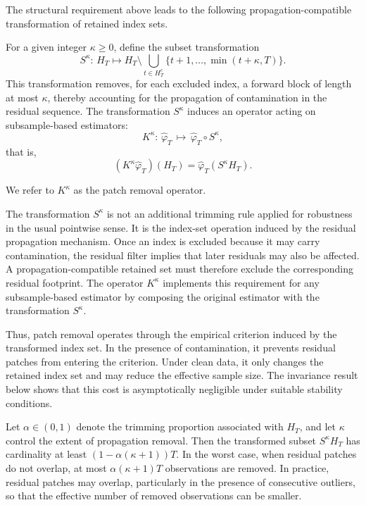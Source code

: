 \documentclass[12pt]{article}
\numberwithin{equation}{section}
\begin{document}
The structural requirement above leads to the following propagation-compatible transformation of retained index sets.
\begin{definition}
For a given integer $\kappa \geq 0$, define the subset transformation
\begin{equation}\label{eqn:patch-removal}
S^\kappa:\, H_T \mapsto 
H_T \setminus
\bigcup_{t \in H_T^c}
\{t+1, \dots, \min(t+\kappa, T)\}.
\end{equation}
This transformation removes, for each excluded index, a forward block of length at most $\kappa$, thereby accounting for the propagation of contamination in the residual sequence.
The transformation $S^\kappa$ induces an operator acting on subsample-based estimators:
\begin{equation}\label{eqn:PROperator1}
K^\kappa:\, \hat{\varphi}_T\, \mapsto\, \hat{\varphi}_T \circ S^\kappa,
\end{equation}
that is,
\begin{equation}\label{eqn:PROperator2}
(K^\kappa \hat{\varphi}_T)(H_T)
=
\hat{\varphi}_T(S^\kappa H_T).
\end{equation}

We refer to $K^\kappa$ as the patch removal operator.
\end{definition}
The transformation $S^\kappa$ is not an additional trimming rule applied for robustness in the usual pointwise sense. 
It is the index-set operation induced by the residual propagation mechanism. 
Once an index is excluded because it may carry contamination, the residual filter implies that later residuals may also be affected. 
A propagation-compatible retained set must therefore exclude the corresponding residual footprint. 
The operator $K^\kappa$ implements this requirement for any subsample-based estimator by composing the original estimator with the transformation $S^\kappa$.

Thus, patch removal operates through the empirical criterion induced by the transformed index set.
In the presence of contamination, it prevents residual patches from entering the criterion. 
Under clean data, it only changes the retained index set and may reduce the effective sample size. 
The invariance result below shows that this cost is asymptotically negligible under suitable stability conditions.

Let $\alpha \in (0,1)$ denote the trimming proportion associated with $H_T$, and let $\kappa$ control the extent of propagation removal. 
Then the transformed subset $S^\kappa H_T$ has cardinality at least $(1 - \alpha(\kappa + 1))T$. 
In the worst case, when residual patches do not overlap, at most $\alpha(\kappa+1)T$ observations are removed. 
In practice, residual patches may overlap, particularly in the presence of consecutive outliers, so that the effective number of removed observations can be smaller.
\end{document}
